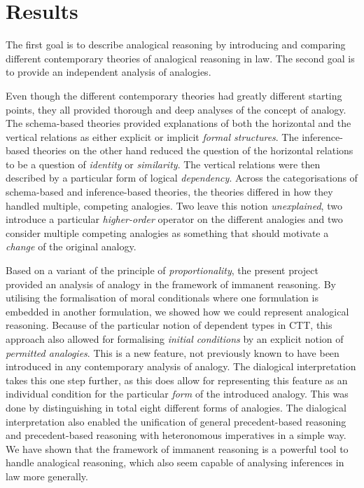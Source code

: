 	\section{Results}
	
		The first goal is to describe analogical reasoning by introducing and comparing different contemporary theories of analogical reasoning in law. The second goal is to provide an independent analysis of analogies. 
		
		Even though the different contemporary theories had greatly different starting points, they all provided thorough and deep analyses of the concept of analogy. The schema-based theories provided explanations of both the horizontal and the vertical relations as either explicit or implicit \textit{formal structures}. The inference-based theories on the other hand reduced the question of the horizontal relations to be a question of \textit{identity} or \textit{similarity}. The vertical relations were then described by a particular form of logical \textit{dependency}. Across the categorisations of schema-based and inference-based theories, the theories differed in how they handled multiple, competing analogies. Two leave this notion \textit{unexplained}, two introduce a particular \textit{higher-order} operator on the different analogies and two consider multiple competing analogies as something that should motivate a \textit{change} of the original analogy. 
		
		Based on a variant of the principle of \textit{proportionality}, the present project provided an analysis of analogy in the framework of immanent reasoning. By utilising the formalisation of moral conditionals where one formulation is embedded in another formulation, we showed how we could represent analogical reasoning. Because of the particular notion of dependent types in CTT, this approach also allowed for formalising \textit{initial conditions} by an explicit notion of \textit{permitted analogies}. This is a new feature, not previously known to have been introduced in any contemporary analysis of analogy. The dialogical interpretation takes this one step further, as this does allow for representing this feature as an individual condition for the particular \textit{form} of the introduced analogy. This was done by distinguishing in total eight different forms of analogies. The dialogical interpretation also enabled the unification of general precedent-based reasoning and precedent-based reasoning with heteronomous imperatives in a simple way. We have shown that the framework of immanent reasoning is a powerful tool to handle analogical reasoning, which also seem capable of analysing inferences in law more generally. 

